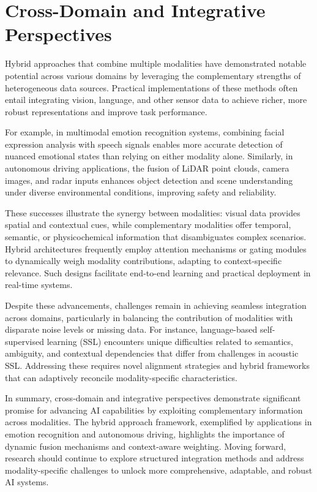 \documentclass[sigconf]{acmart}
\begin{document}
\section{Cross-Domain and Integrative Perspectives}

Hybrid approaches that combine multiple modalities have demonstrated notable potential across various domains by leveraging the complementary strengths of heterogeneous data sources. Practical implementations of these methods often entail integrating vision, language, and other sensor data to achieve richer, more robust representations and improve task performance.

For example, in multimodal emotion recognition systems, combining facial expression analysis with speech signals enables more accurate detection of nuanced emotional states than relying on either modality alone. Similarly, in autonomous driving applications, the fusion of LiDAR point clouds, camera images, and radar inputs enhances object detection and scene understanding under diverse environmental conditions, improving safety and reliability.

These successes illustrate the synergy between modalities: visual data provides spatial and contextual cues, while complementary modalities offer temporal, semantic, or physicochemical information that disambiguates complex scenarios. Hybrid architectures frequently employ attention mechanisms or gating modules to dynamically weigh modality contributions, adapting to context-specific relevance. Such designs facilitate end-to-end learning and practical deployment in real-time systems.

Despite these advancements, challenges remain in achieving seamless integration across domains, particularly in balancing the contribution of modalities with disparate noise levels or missing data. For instance, language-based self-supervised learning (SSL) encounters unique difficulties related to semantics, ambiguity, and contextual dependencies that differ from challenges in acoustic SSL. Addressing these requires novel alignment strategies and hybrid frameworks that can adaptively reconcile modality-specific characteristics.

In summary, cross-domain and integrative perspectives demonstrate significant promise for advancing AI capabilities by exploiting complementary information across modalities. The hybrid approach framework, exemplified by applications in emotion recognition and autonomous driving, highlights the importance of dynamic fusion mechanisms and context-aware weighting. Moving forward, research should continue to explore structured integration methods and address modality-specific challenges to unlock more comprehensive, adaptable, and robust AI systems.
\end{document}

